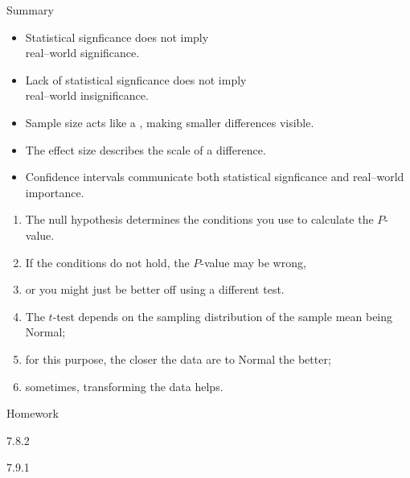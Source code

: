 \begin{frame}{Summary}

    \begin{itemize}
        \item Statistical signficance \alert{does not imply} \\real--world significance.
        \item Lack of statistical signficance \alert{does not imply} \\real--world insignificance.
        \item Sample size acts like a , making smaller differences visible.
        \item The \alert{effect size} describes the scale of a difference.
        \item Confidence intervals communicate both statistical signficance and real--world importance.
    \end{itemize}

    \vspace{1em}

  \begin{enumerate}
  \item The null hypothesis determines the conditions you use to calculate the $P$-value.
  \item If the conditions do not hold, the $P$-value may be wrong,
  \item or you might just be better off using a different test.
  \item The $t$-test depends on the sampling distribution of the sample mean being Normal;
  \item for this purpose, the closer the data are to Normal the better;
  \item sometimes, transforming the data helps.
  \end{enumerate}
\end{frame}

\begin{frame}{Homework}
  \begin{center}

  7.8.2

  \vspace{2em}

  7.9.1


  \end{center}
\end{frame}








